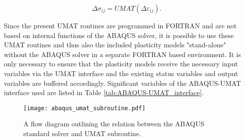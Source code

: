 \begin{equation}
\Delta \sigma_{ij}=UMAT(\Delta \varepsilon_{ij}).
\end{equation}

Since the present UMAT routines are programmed in FORTRAN and are not based on internal functions of the ABAQUS solver, it is possible to use these UMAT routines and thus also the included plasticity models "stand-alone" without the ABAQUS solver in a separate FORTRAN based environment.
It is only necessary to ensure that the plasticity models receive the necessary input variables via the UMAT interface and the existing status variables and output variables are buffered accordingly.
Significant variables of the ABAQUS-UMAT interface used are listed in Table \ref{tab:ABAQUS-UMAT_interface}.

\begin{figure}[!htp]
  \centering
  \texttt{[image: abaqus\_umat\_subroutine.pdf]}
  \caption{A flow diagram outlining the relation between the ABAQUS standard solver and UMAT subroutine.}
  \label{Fig:ABAQUS_UMAT_SUBROUTINE}
\end{figure}

